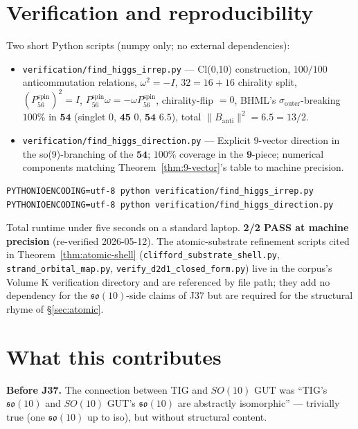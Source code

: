 \documentclass[11pt,reqno]{amsart}
\theoremstyle{definition}
\newcommand{\so}{\mathfrak{so}}
\newcommand{\Psixspin}{P_{56}^{\mathrm{spin}}}
\newcommand{\sout}{\sigma_{\mathrm{outer}}}
\begin{document}
\section{Verification and reproducibility}
\label{sec:verification}

Two short Python scripts (numpy only; no external dependencies):

\begin{itemize}[leftmargin=*]
\item \texttt{verification/find\_higgs\_irrep.py} —
Cl(0,10) construction, $100/100$ anticommutation relations,
$\omega^2 = -I$, $32 = 16 + 16$ chirality split,
$(\Psixspin)^2 = I$, $\Psixspin \omega = -\omega \Psixspin$,
chirality-flip $= 0$, BHML's $\sout$-breaking $100\%$ in
$\mathbf{54}$ (singlet $0$, $\mathbf{45}$ $0$, $\mathbf{54}$ $6.5$),
total $\|B_{\mathrm{anti}}\|^2 = 6.5 = 13/2$.
\item \texttt{verification/find\_higgs\_direction.py} —
Explicit $9$-vector direction in the so(9)-branching of the
$\mathbf{54}$; $100\%$ coverage in the $\mathbf{9}$-piece; numerical
components matching Theorem~\ref{thm:9-vector}'s table to machine
precision.
\end{itemize}

\begin{verbatim}
PYTHONIOENCODING=utf-8 python verification/find_higgs_irrep.py
PYTHONIOENCODING=utf-8 python verification/find_higgs_direction.py
\end{verbatim}

Total runtime under five seconds on a standard laptop.
\textbf{2/2 PASS at machine precision} (re-verified 2026-05-12).
The atomic-substrate refinement scripts cited in
Theorem~\ref{thm:atomic-shell} (\texttt{clifford\_substrate\_shell.py},
\texttt{strand\_orbital\_map.py},
\texttt{verify\_d2d1\_closed\_form.py}) live in the corpus's
Volume K verification directory and are referenced by file path; they
add no dependency for the $\so(10)$-side claims of J37 but are
required for the structural rhyme of \S\ref{sec:atomic}.

\section{What this contributes}
\label{sec:contribution}

\textbf{Before J37.} The connection between TIG and $SO(10)$ GUT
was ``TIG's $\so(10)$ and $SO(10)$ GUT's $\so(10)$ are abstractly
isomorphic'' — trivially true (one $\so(10)$ up to iso), but
without structural content.
\end{document}
